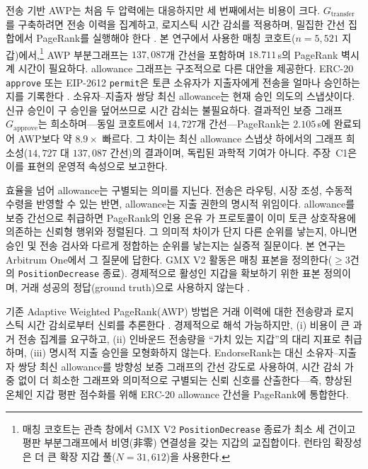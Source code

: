 전송 기반 AWP는 처음 두 압력에는 대응하지만 세 번째에서는 비용이 크다. $G_{\text{transfer}}$를 구축하려면 전송 이력을 집계하고, 로지스틱 시간 감쇠를 적용하며, 밀집한 간선 집합에서 PageRank를 실행해야 한다 . 본 연구에서 사용한 매칭 코호트($n=5{,}521$ 지갑)에서,\footnote{매칭 코호트는 관측 창에서 GMX V2 \texttt{PositionDecrease} 종료가 최소 세 건이고 평판 부분그래프에서 비영(非零) 연결성을 갖는 지갑의 교집합이다. 런타임 확장성은 더 큰 확장 지갑 풀($N=31{,}612$)을 사용한다.} AWP 부분그래프는 $137{,}087$개 간선을 포함하며 $18.711$\,s의 PageRank 벽시계 시간이 필요하다. allowance 그래프는 구조적으로 다른 대안을 제공한다. ERC-20 \texttt{approve} 또는 EIP-2612 \texttt{permit}은 토큰 소유자가 지출자에게 전송을 얼마나 승인하는지를 기록한다 . 소유자--지출자 쌍당 최신 allowance는 현재 승인 의도의 스냅샷이다. 신규 승인이 구 승인을 덮어쓰므로 시간 감쇠는 불필요하다. 결과적인 보증 그래프 $G_{\text{approve}}$는 희소하며---동일 코호트에서 $14{,}727$개 간선---PageRank는 $2.105$\,s에 완료되어 AWP보다 약 $8.9\times$ 빠르다. 그 차이는 최신 allowance 스냅샷 하에서의 그래프 희소성($14{,}727$ 대 $137{,}087$ 간선)의 결과이며, 독립된 과학적 기여가 아니다. 주장~C1은 이를 표현의 운영적 속성으로 보고한다.

효율을 넘어 allowance는 구별되는 의미를 지닌다. 전송은 라우팅, 시장 조성, 수동적 수령을 반영할 수 있는 반면, allowance는 지출 권한의 명시적 위임이다. allowance를 보증 간선으로 취급하면 PageRank의 인용 은유 가 프로토콜이 이미 토큰 상호작용에 의존하는 신뢰형 행위와 정렬된다. 그 의미적 차이가 단지 다른 순위를 낳는지, 아니면 승인 및 전송 검사와 다르게 정합하는 순위를 낳는지는 실증적 질문이다. 본 연구는 Arbitrum One에서 그 질문에 답한다. GMX V2 활동은 매칭 표본을 정의한다($\geq 3$건의 \texttt{PositionDecrease} 종료). 경제적으로 활성인 지갑을 확보하기 위한 표본 정의이며, 거래 성공의 정답(ground truth)으로 사용하지 않는다 .


기존 Adaptive Weighted PageRank(AWP) 방법은 거래 이력에 대한 전송량과 로지스틱 시간 감쇠로부터 신뢰를 추론한다 . 경제적으로 해석 가능하지만, (i) 비용이 큰 과거 전송 집계를 요구하고, (ii) 인바운드 전송량을 ``가치 있는 지갑''의 대리 지표로 취급하며, (iii) 명시적 지출 승인을 모형화하지 않는다. EndorseRank는 대신 소유자--지출자 쌍당 최신 allowance를 방향성 보증 그래프의 간선 강도로 사용하여, 시간 감쇠 가중 없이 더 희소한 그래프와 의미적으로 구별되는 신뢰 신호를 산출한다---즉, 향상된 온체인 지갑 평판 점수화를 위해 ERC-20 allowance 간선을 PageRank에 통합한다.

